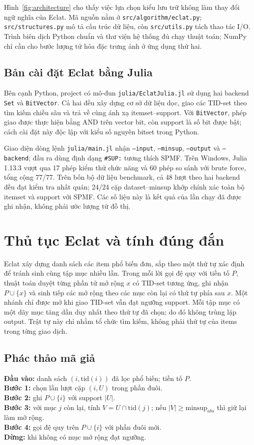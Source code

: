 \documentclass[conference,10pt]{IEEEtran}
\newcommand{\myitem}[1]{\texttt{#1}}
\begin{document}
Hình~\ref{fig:architecture} cho thấy việc lựa chọn kiểu lưu trữ không làm thay đổi ngữ nghĩa của Eclat. Mã nguồn nằm ở \myitem{src/algorithm/eclat.py}; \myitem{src/structures.py} mô tả cấu trúc dữ liệu, còn \myitem{src/utils.py} tách thao tác I/O. Trình biên dịch Python chuẩn và thư viện hệ thống đủ chạy thuật toán; NumPy chỉ cần cho bước lượng tử hóa đặc trưng ảnh ở ứng dụng thứ hai.

\subsection{Bản cài đặt Eclat bằng Julia}
Bên cạnh Python, project có mô-đun \myitem{julia/EclatJulia.jl} sử dụng hai backend \myitem{Set} và \myitem{BitVector}. Cả hai đều xây dựng cơ sở dữ liệu dọc, giao các TID-set theo tìm kiếm chiều sâu và trả về cùng ánh xạ itemset--support. Với \myitem{BitVector}, phép giao được thực hiện bằng AND trên vector bit, còn support là số bit được bật; cách cài đặt này độc lập với kiểu số nguyên bitset trong Python.

Giao diện dòng lệnh \myitem{julia/main.jl} nhận \myitem{--input}, \myitem{--minsup}, \myitem{--output} và \myitem{--backend}; đầu ra dùng định dạng \myitem{\#SUP:} tương thích SPMF. Trên Windows, Julia 1.13.3 vượt qua 17 phép kiểm thử chức năng và 60 phép so sánh với brute force, tổng cộng 77/77. Trên bốn bộ dữ liệu benchmark, cả 48 lượt theo hai backend đều đạt kiểm tra nhất quán; 24/24 cặp dataset--minsup khớp chính xác toàn bộ itemset và support với SPMF. Các số liệu này là kết quả của lần chạy đã được ghi nhận, không phải ước lượng từ đồ thị.

\section{Thủ tục Eclat và tính đúng đắn}
Eclat xây dựng danh sách các item phổ biến đơn, sắp theo một thứ tự xác định để tránh sinh cùng tập mục nhiều lần. Trong mỗi lời gọi đệ quy với tiền tố $P$, thuật toán duyệt từng phần tử mở rộng $x$ có TID-set tương ứng, ghi nhận $P\cup\{x\}$ và sinh tiếp các mở rộng theo các mục còn lại có thứ tự phía sau $x$. Một nhánh chỉ được mở khi giao TID-set vẫn đạt ngưỡng support. Mỗi tập mục có một dãy mục tăng dần duy nhất theo thứ tự đã chọn; do đó không trùng lặp output. Trật tự này chỉ nhằm tổ chức tìm kiếm, không phải thứ tự của items trong từng giao dịch.

\subsection{Phác thảo mã giả}
\noindent\textbf{Đầu vào:} danh sách $(i,\mathrm{tid}(i))$ đã lọc phổ biến; tiền tố $P$.\\
\textbf{Bước 1:} chọn lần lượt cặp $(i,U)$ trong phần đuôi.\\
\textbf{Bước 2:} ghi $P\cup\{i\}$ với support $|U|$.\\
\textbf{Bước 3:} với mục $j$ còn lại, tính $V=U\cap\mathrm{tid}(j)$; nếu $|V|\ge\text{minsup}_{abs}$ thì giữ lại làm mở rộng.\\
\textbf{Bước 4:} gọi đệ quy trên $P\cup\{i\}$ với phần đuôi mới.\\
\textbf{Dừng:} khi không có mục mở rộng đạt ngưỡng.
\end{document}
